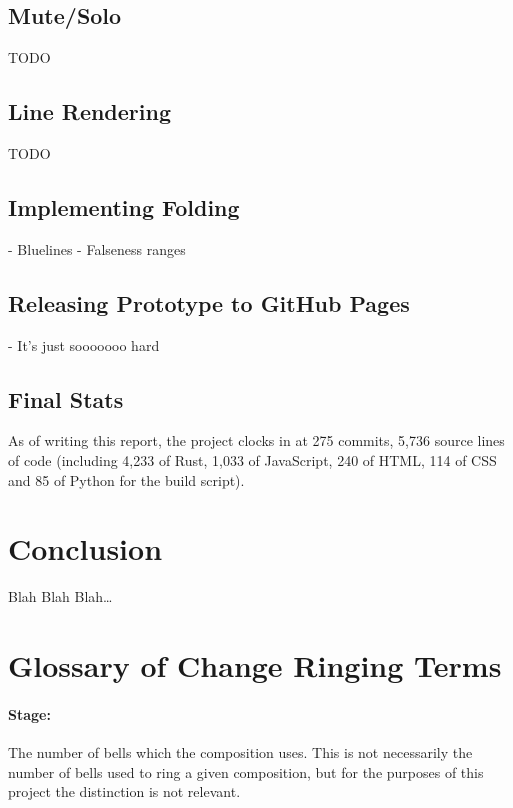 \documentclass[12pt]{article}
\begin{document}
\subsection{Mute/Solo}

TODO

\subsection{Line Rendering}

TODO

\subsection{Implementing Folding}

- Bluelines
- Falseness ranges

\subsection{Releasing Prototype to GitHub Pages}

- It's just sooooooo hard

\subsection{Final Stats}

As of writing this report, the project clocks in at 275 commits, 5,736 source lines of code
(including 4,233 of Rust, 1,033 of JavaScript, 240 of HTML, 114 of CSS and 85 of Python for the
build script).



\pagebreak

\section{Conclusion}

Blah Blah Blah\ldots



\pagebreak

\section{Glossary of Change Ringing Terms}

\paragraph{Stage:} The number of bells which the composition uses.  This is not necessarily the
number of bells used to ring a given composition, but for the purposes of this project the
distinction is not relevant.
\end{document}
